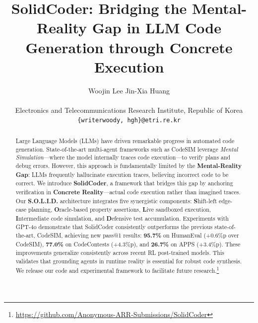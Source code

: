 \documentclass[11pt]{article}
\title{SolidCoder: Bridging the Mental-Reality Gap in LLM Code Generation through Concrete Execution}
\author{
Woojin Lee \quad
Jin-Xia Huang \\
\\Electronics and Telecommunications Research Institute, Republic of Korea  \\
\texttt{\{writerwoody, hgh\}@etri.re.kr} \\
}
\begin{document}
\maketitle
\begin{abstract}
Large Language Models (LLMs) have driven remarkable progress in automated code generation. State-of-the-art multi-agent frameworks such as CodeSIM leverage \textit{Mental Simulation}---where the model internally traces code execution---to verify plans and debug errors. However, this approach is fundamentally limited by the \textbf{Mental-Reality Gap}: LLMs frequently hallucinate execution traces, believing incorrect code to be correct. We introduce \textbf{SolidCoder}, a framework that bridges this gap by anchoring verification in \textbf{Concrete Reality}---actual code execution rather than imagined traces. Our \textbf{S.O.L.I.D.} architecture integrates five synergistic components: \textbf{S}hift-left edge-case planning, \textbf{O}racle-based property assertions, \textbf{L}ive sandboxed execution, \textbf{I}ntermediate code simulation, and \textbf{D}efensive test accumulation. Experiments with GPT-4o demonstrate that SolidCoder consistently outperforms the previous state-of-the-art, CodeSIM, achieving new pass@1 results: \textbf{95.7\%} on HumanEval (+0.6\%p over CodeSIM), \textbf{77.0\%} on CodeContests (+4.3\%p), and \textbf{26.7\%} on APPS (+3.4\%p). These improvements generalize consistently across recent RL post-trained models. This validates that grounding agents in runtime reality is essential for robust code synthesis. We release our code and experimental framework to facilitate future research.\footnote{\url{https://github.com/Anonymous-ARR-Submissions/SolidCoder}}
\end{abstract}
\end{document}
